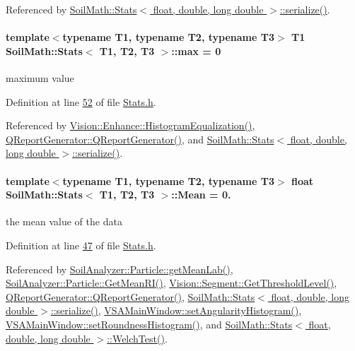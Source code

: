 Referenced by \hyperlink{_stats_8h_source_l00651}{Soil\+Math\+::\+Stats$<$ float, double, long double $>$\+::serialize()}.

\hypertarget{class_soil_math_1_1_stats_ad49ee1f533564ec587cf98a094b8c564}{}
\paragraph[{max}]{\setlength{\rightskip}{0pt plus 5cm}template$<$typename T1, typename T2, typename T3$>$ T1 {\bf Soil\+Math\+::\+Stats}$<$ T1, T2, T3 $>$\+::max = 0}\label{class_soil_math_1_1_stats_ad49ee1f533564ec587cf98a094b8c564}
maximum value 

Definition at line \hyperlink{_stats_8h_source_l00052}{52} of file \hyperlink{_stats_8h_source}{Stats.\+h}.



Referenced by \hyperlink{_enhance_8cpp_source_l00277}{Vision\+::\+Enhance\+::\+Histogram\+Equalization()}, \hyperlink{qreportgenerator_8cpp_source_l00004}{Q\+Report\+Generator\+::\+Q\+Report\+Generator()}, and \hyperlink{_stats_8h_source_l00651}{Soil\+Math\+::\+Stats$<$ float, double, long double $>$\+::serialize()}.

\hypertarget{class_soil_math_1_1_stats_a6f53982d52cf492ddd4df9b56bd014e7}{}
\paragraph[{Mean}]{\setlength{\rightskip}{0pt plus 5cm}template$<$typename T1, typename T2, typename T3$>$ float {\bf Soil\+Math\+::\+Stats}$<$ T1, T2, T3 $>$\+::Mean = 0.}\label{class_soil_math_1_1_stats_a6f53982d52cf492ddd4df9b56bd014e7}
the mean value of the data 

Definition at line \hyperlink{_stats_8h_source_l00047}{47} of file \hyperlink{_stats_8h_source}{Stats.\+h}.



Referenced by \hyperlink{particle_8cpp_source_l00096}{Soil\+Analyzer\+::\+Particle\+::get\+Mean\+Lab()}, \hyperlink{particle_8cpp_source_l00120}{Soil\+Analyzer\+::\+Particle\+::\+Get\+Mean\+R\+I()}, \hyperlink{_segment_8cpp_source_l00069}{Vision\+::\+Segment\+::\+Get\+Threshold\+Level()}, \hyperlink{qreportgenerator_8cpp_source_l00004}{Q\+Report\+Generator\+::\+Q\+Report\+Generator()}, \hyperlink{_stats_8h_source_l00651}{Soil\+Math\+::\+Stats$<$ float, double, long double $>$\+::serialize()}, \hyperlink{vsamainwindow_8cpp_source_l00315}{V\+S\+A\+Main\+Window\+::set\+Angularity\+Histogram()}, \hyperlink{vsamainwindow_8cpp_source_l00291}{V\+S\+A\+Main\+Window\+::set\+Roundness\+Histogram()}, and \hyperlink{_stats_8h_source_l00075}{Soil\+Math\+::\+Stats$<$ float, double, long double $>$\+::\+Welch\+Test()}.

